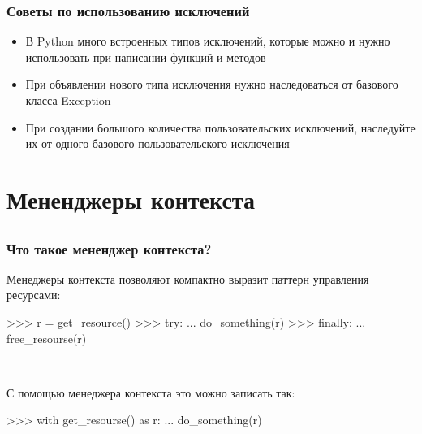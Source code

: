 \documentclass[fleqn, xcolor=x11names]{beamer}
\begin{document}
\begin{frame}[fragile]\frametitle{Советы по использованию исключений}
\begin{itemize}
    \item В Python много встроенных типов исключений, которые
    можно и нужно использовать при написании функций и
    методов
    
    \item При объявлении нового типа исключения нужно наследоваться от базового класса Exception
    
    \item При создании большого количества пользовательских исключений, наследуйте их от одного базового пользовательского исключения
\end{itemize}
\end{frame}

\section{Мененджеры контекста}
\subsection*{}

\begin{frame}[fragile]\frametitle{Что такое мененджер контекста?}
Менеджеры контекста позволяют компактно выразит паттерн управления ресурсами:

\begin{pcode}
>>> r = get_resource()
>>> try:
...     do_something(r)
>>> finally:
...     free_resourse(r)
\end{pcode}

\

С помощью менеджера контекста это можно записать так:
\begin{pcode}
>>> with get_resourse() as r:
...     do_something(r)
\end{pcode}
\end{frame}
\end{document}
